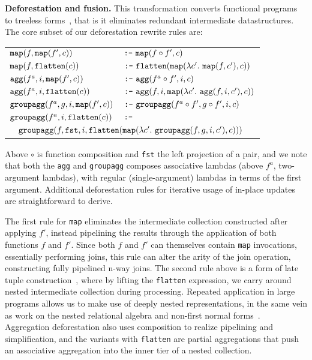 \vspace{1mm}
\noindent\textbf{Deforestation and fusion.} This transformation converts
functional programs to treeless forms~\cite{marlow-fp:92}, that is it eliminates
redundant intermediate datastructures. The core subset of our deforestation
rewrite rules are:

\def\xform{\mbox{\texttt{:-}}}
\def\fst{\mbox{\texttt{fst}}}

\vspace{1mm}\hspace{-6mm}
\begin{tabular}{p{3.6cm}l}
$\mbox{\texttt{map}}(f, \mbox{\texttt{map}}(f', c))$ 
    & $\xform\ \map(f \circ f', c)$
\\
$\mbox{\texttt{map}}(f, \mbox{\texttt{flatten}}(c))$
    & $\xform\ \flatten(\map(\lambda c'.\ \map(f,c'), c))$
\\
$\mbox{\texttt{agg}}(f^a, i, \mbox{\texttt{map}}(f', c))$
    & $\xform\ \agg(f^a \circ f', i, c)$
\\
$\mbox{\texttt{agg}}(f^a, i, \mbox{\texttt{flatten}}(c))$
    & $\xform\ \agg(f, i, \map(\lambda c'.\ \agg(f, i, c'),c))$
\\
$\mbox{\texttt{groupagg}}(f^a, g, i, \mbox{\texttt{map}}(f', c))$
    & $\xform\ \groupagg(f^a \circ f', g \circ f', i, c)$
\\
$\mbox{\texttt{groupagg}}(f^a, i, \mbox{\texttt{flatten}}(c))$ & $\xform$
\\
\multicolumn{2}{l}{
$\quad\groupagg(f, \fst, i, \flatten(
    \map(\lambda c'.\ \groupagg(f, g, i, c'),c)))$}
\end{tabular}


\vspace{1mm}
Above $\circ$ is function composition and \texttt{fst} the left projection of a
pair, and we note that both the \texttt{agg} and \texttt{groupagg} composes
associative lambdas (above $f^a$, two-argument lambdas), with regular
(single-argument) lambdas in terms of the first argument. Additional
deforestation rules for iterative usage of in-place updates are
straightforward to derive.

The first rule for \texttt{map} eliminates the intermediate collection
constructed after applying $f'$, instead pipelining the results through the
application of both functions $f$ and $f'$. Since both $f$ and $f'$ can
themselves contain \texttt{map} invocations, essentially performing joins, this
rule can alter the arity of the join operation, constructing fully pipelined
n-way joins. The second rule above is a form of late tuple
construction~\cite{abadi-icde:07}, where by lifting the \texttt{flatten}
expression, we carry around nested intermediate collection during processing.
Repeated application in large programs allows us to make use of deeply nested
representations, in the same vein as work on the nested relational algebra and
non-first normal forms~\cite{schek-infsys:86}. Aggregation deforestation also
uses composition to realize pipelining and simplification, and the variants with
\texttt{flatten} are partial aggregations that push an associative aggregation
into the inner tier of a nested collection.


